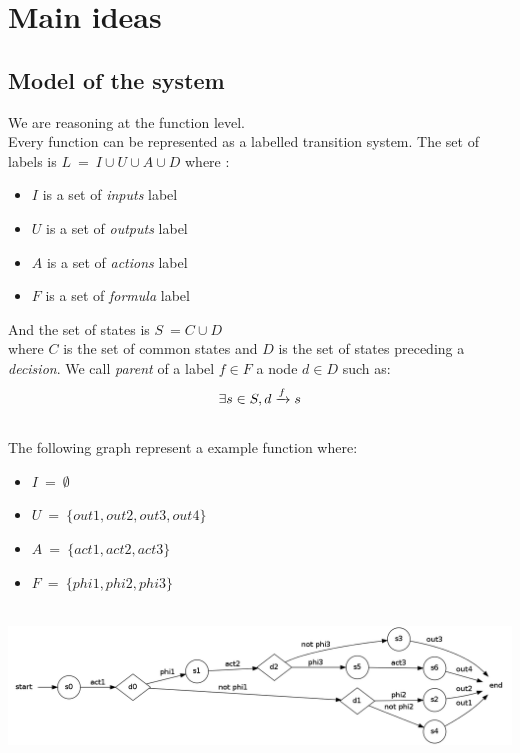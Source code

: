 \documentclass[a4paper]{report}
\begin{document}
\chapter*{Main ideas}

\section*{Model of the system}

We are reasoning at the function level.\\
Every function can be represented as a labelled transition system. The set of labels is $L\ =\ I \cup U \cup A \cup D$ where :\\
\begin{itemize}
\item $I$ is a set of \textit{inputs} label
\item $U$ is a set of \textit{outputs} label
\item $A$ is a set of \textit{actions} label
\item $F$ is a set of \textit{formula} label
\end{itemize}
And the set of states is $S\ = C \cup D$\\
where $C$ is the set of common states and $D$ is the set of states preceding a \textit{decision}.
We call \textit{parent} of a label $f \in F$ a node $d \in D$ such as:\\
\[
\exists s \in S, 
d \xrightarrow{f} s\\
\]
$ $\\
\newline
The following graph represent a example function where:
\begin{itemize}
\item $I\ =\ \emptyset$
\item $U\ =\ \{out1, out2, out3, out4\}$
\item $A\ =\ \{act1, act2, act3\}$
\item $F\ =\ \{phi1, phi2, phi3\}$
\end{itemize}
$ $\\
\includegraphics[scale=0.3]{../graphviz/LTSExample.png}
$ $\\
\newline
\end{document}
